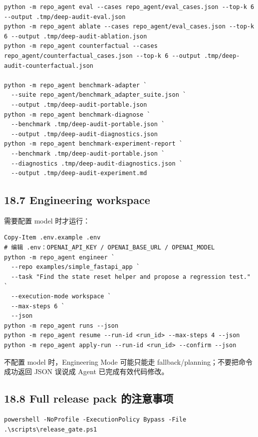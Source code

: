 \documentclass[UTF8,12pt,openany]{ctexbook}
\begin{document}
\begin{lstlisting}
python -m repo_agent eval --cases repo_agent/eval_cases.json --top-k 6 --output .tmp/deep-audit-eval.json
python -m repo_agent ablate --cases repo_agent/eval_cases.json --top-k 6 --output .tmp/deep-audit-ablation.json
python -m repo_agent counterfactual --cases repo_agent/counterfactual_cases.json --top-k 6 --output .tmp/deep-audit-counterfactual.json

python -m repo_agent benchmark-adapter `
  --suite repo_agent/benchmark_adapter_suite.json `
  --output .tmp/deep-audit-portable.json
python -m repo_agent benchmark-diagnose `
  --benchmark .tmp/deep-audit-portable.json `
  --output .tmp/deep-audit-diagnostics.json
python -m repo_agent benchmark-experiment-report `
  --benchmark .tmp/deep-audit-portable.json `
  --diagnostics .tmp/deep-audit-diagnostics.json `
  --output .tmp/deep-audit-experiment.md
\end{lstlisting}

\subsection{18.7 Engineering workspace}

需要配置 model 时才运行：\par

\begin{lstlisting}
Copy-Item .env.example .env
# 编辑 .env：OPENAI_API_KEY / OPENAI_BASE_URL / OPENAI_MODEL
python -m repo_agent engineer `
  --repo examples/simple_fastapi_app `
  --task "Find the state reset helper and propose a regression test." `
  --execution-mode workspace `
  --max-steps 6 `
  --json
python -m repo_agent runs --json
python -m repo_agent resume --run-id <run_id> --max-steps 4 --json
python -m repo_agent apply-run --run-id <run_id> --confirm --json
\end{lstlisting}

不配置 model 时，Engineering Mode 可能只能走 fallback/planning；不要把命令成功返回 JSON 误说成 Agent 已完成有效代码修改。\par

\subsection{18.8 Full release pack 的注意事项}

\begin{lstlisting}
powershell -NoProfile -ExecutionPolicy Bypass -File .\scripts\release_gate.ps1
\end{lstlisting}
\end{document}
